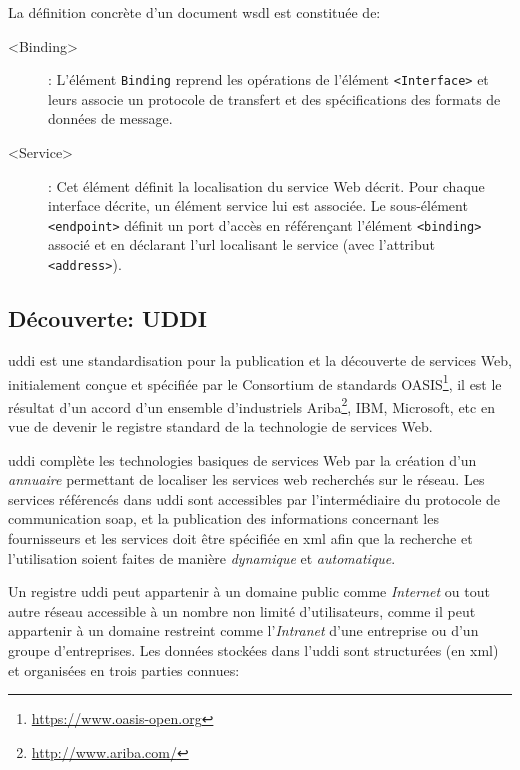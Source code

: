   La définition concrète d'un document \acrshort{wsdl} est constituée
  de:\medskip

  \renewcommand{\descriptionlabel}[1]{\hspace{0.5cm}\textbullet~\texttt{#1}}
  \begin{description}
  \item[<Binding>]: L'élément \texttt{Binding} reprend les opérations
    de l'élément \texttt{<Interface>} et leurs associe un protocole de
    transfert et des spécifications des formats de données de message.

  \item[<Service>]: Cet élément définit la localisation du service Web
    décrit. Pour chaque interface décrite, un élément service lui est
    associée. Le sous-élément \texttt{<endpoint>} définit un port
    d'accès en référençant l'élément \texttt{<binding>} associé et en
    déclarant l'\acrshort{url} localisant le service (avec l'attribut
    \texttt{<address>}).
  \end{description}

  \subsection{Découverte: UDDI}
  \label{sec:uddi}
  \acrshort{uddi} \cite{clement2004uddi} est une standardisation pour
  la publication et la découverte de services Web, initialement conçue
  et spécifiée par le Consortium de standards
  OASIS\footnote{\url{https://www.oasis-open.org}}, il est le résultat
  d'un accord d'un ensemble d'industriels
  Ariba\footnote{\url{http://www.ariba.com/}}, IBM, Microsoft, etc en
  vue de devenir le registre standard de la technologie de services
  Web.\medskip

  \acrshort{uddi} complète les technologies basiques de services Web
  par la création d'un \textit{annuaire} permettant de localiser
  les services web recherchés sur le réseau. Les services référencés
  dans \acrshort{uddi} sont accessibles par l'intermédiaire du
  protocole de communication \acrshort{soap}, et la publication des
  informations concernant les fournisseurs et les services doit être
  spécifiée en \acrshort{xml} afin que la recherche et l'utilisation
  soient faites de manière \textit{dynamique} et
  \textit{automatique}.\medskip

  Un registre \acrshort{uddi} peut appartenir à un domaine public
  comme \textit{Internet} ou tout autre réseau accessible à un nombre
  non limité d'utilisateurs, comme il peut appartenir à un domaine
  restreint comme l'\textit{Intranet} d'une entreprise ou d'un groupe
  d'entreprises. Les données stockées dans l'\acrshort{uddi} sont
  structurées (en \acrshort{xml}) et organisées en trois parties
  connues:\medskip

